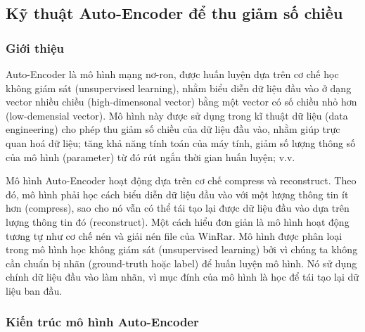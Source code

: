 \subsection{Kỹ thuật Auto-Encoder để thu giảm số chiều}
\subsubsection{Giới thiệu}

Auto-Encoder là mô hình mạng nơ-ron, được huấn luyện dựa trên cơ chế học không giám sát (unsupervised learning), nhằm biểu diễn dữ liệu đầu vào ở dạng vector nhiều chiều (high-dimensonal vector) bằng một vector có số chiều nhỏ hơn (low-demensial vector). Mô hình này được sử dụng trong kĩ thuật dữ liệu (data engineering) cho phép thu giảm số chiều của dữ liệu đầu vào, nhằm giúp trực quan hoá dữ liệu; tăng khả năng tính toán của máy tính, giảm số lượng thông số của mô hình (parameter) từ đó rút ngắn thời gian huấn luyện; v.v.

Mô hình Auto-Encoder hoạt động dựa trên cơ chế compress và reconstruct. Theo đó, mô hình phải học cách biểu diễn dữ liệu đầu vào với một lượng thông tin ít hơn (compress), sao cho nó vẫn có thể tái tạo lại được dữ liệu đầu vào dựa trên lượng thông tin đó (reconstruct). Một cách hiểu đơn giản là mô hình hoạt động tương tự như cơ chế nén và giải nén file của WinRar. Mô hình được phân loại trong mô hình học không giám sát (unsupervised learning) bởi vì chúng ta không cần chuẩn bị nhãn (ground-truth hoặc label) để huấn luyện mô hình. Nó sử dụng chính dữ liệu đầu vào làm nhãn, vì mục đính của mô hình là học để tái tạo lại dữ liệu ban đầu.

\subsubsection{Kiến trúc mô hình Auto-Encoder}

